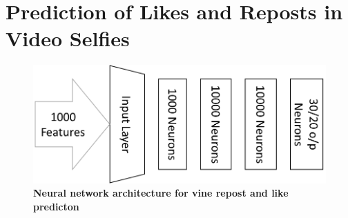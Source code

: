 \section{Prediction of Likes and Reposts in Video Selfies}
\begin{figure}
\centering
\includegraphics[width=\columnwidth]{figures/NN_diag}
\caption{\textbf{ Neural network architecture for vine repost and like predicton }}
\label{fig:NN_diag}
\end{figure}